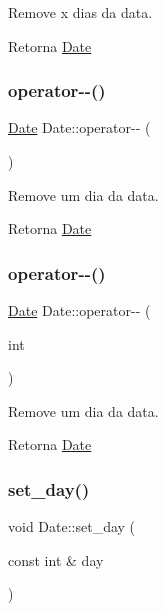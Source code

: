 Remove x dias da data. 

\begin{DoxyReturn}{Retorna}
\hyperlink{classDate}{Date} 
\end{DoxyReturn}
\mbox{\label{classDate_ae7b4f70781bb5775538fddb5f5d8e143}} 
\subsubsection{\texorpdfstring{operator-\/-\/()}{operator--()}\hspace{0.1cm}{\footnotesize\ttfamily [1/2]}}
{\footnotesize\ttfamily \hyperlink{classDate}{Date} Date\+::operator-\/-\/ (\begin{DoxyParamCaption}{ }\end{DoxyParamCaption})}



Remove um dia da data. 

\begin{DoxyReturn}{Retorna}
\hyperlink{classDate}{Date} 
\end{DoxyReturn}
\mbox{\label{classDate_ac2237a5f9f832bb521fe8f299a47db95}} 
\subsubsection{\texorpdfstring{operator-\/-\/()}{operator--()}\hspace{0.1cm}{\footnotesize\ttfamily [2/2]}}
{\footnotesize\ttfamily \hyperlink{classDate}{Date} Date\+::operator-\/-\/ (\begin{DoxyParamCaption}\item[{int}]{ }\end{DoxyParamCaption})}



Remove um dia da data. 

\begin{DoxyReturn}{Retorna}
\hyperlink{classDate}{Date} 
\end{DoxyReturn}
\mbox{\label{classDate_a7bd9d8f2f53cb54c151aff444fd3b4a6}} 
\subsubsection{\texorpdfstring{set\+\_\+day()}{set\_day()}}
{\footnotesize\ttfamily void Date\+::set\+\_\+day (\begin{DoxyParamCaption}\item[{const int \&}]{day }\end{DoxyParamCaption})}



